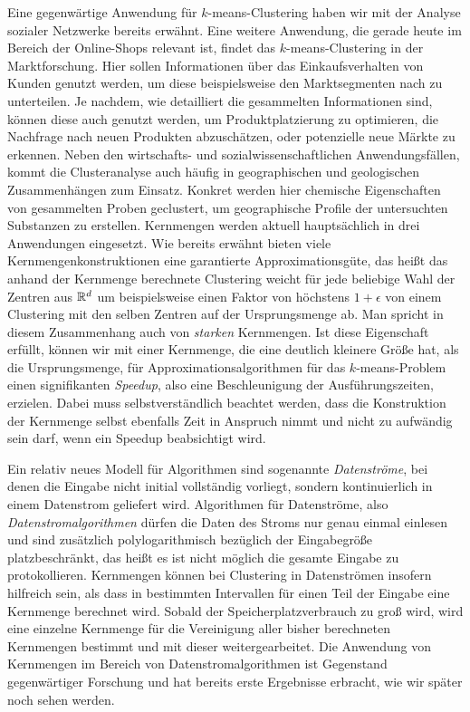 Eine gegenwärtige Anwendung für $k$-means-Clustering haben wir mit der Analyse sozialer Netzwerke bereits erwähnt. Eine weitere
Anwendung, die gerade heute im Bereich der Online-Shops relevant ist, findet das $k$-means-Clustering in der Marktforschung.
Hier sollen Informationen über das Einkaufsverhalten von Kunden genutzt werden, um diese beispielsweise den Marktsegmenten nach
zu unterteilen. Je nachdem, wie detailliert die gesammelten Informationen sind, können diese auch genutzt werden, um
Produktplatzierung zu optimieren, die Nachfrage nach neuen Produkten abzuschätzen, oder potenzielle neue Märkte zu
erkennen. Neben den wirtschafts- und sozialwissenschaftlichen Anwendungsfällen, kommt die Clusteranalyse auch häufig in
geographischen und geologischen Zusammenhängen zum Einsatz. Konkret werden hier chemische Eigenschaften von gesammelten
Proben geclustert, um geographische Profile der untersuchten Substanzen zu erstellen.
\absatz
Kernmengen werden aktuell hauptsächlich in drei Anwendungen eingesetzt. Wie bereits erwähnt bieten viele Kernmengenkonstruktionen
eine garantierte Approximationsgüte, das heißt das anhand der Kernmenge berechnete Clustering weicht für jede beliebige
Wahl der Zentren aus $\mathbb{R}^{d}$ um beispielsweise einen Faktor von höchstens $1 + \epsilon$ von einem Clustering mit den
selben Zentren auf der Ursprungsmenge ab. Man spricht in diesem Zusammenhang auch von \emph{starken} Kernmengen.
Ist diese Eigenschaft erfüllt, können wir mit einer Kernmenge, die eine deutlich kleinere Größe hat, als die Ursprungsmenge,
für Approximationsalgorithmen für das $k$-means-Problem einen signifikanten \emph{Speedup}, also eine Beschleunigung der
Ausführungszeiten, erzielen. Dabei muss selbstverständlich beachtet werden, dass die Konstruktion der Kernmenge selbst
ebenfalls Zeit in Anspruch nimmt und nicht zu aufwändig sein darf, wenn ein Speedup beabsichtigt wird. 

Ein relativ neues Modell für Algorithmen sind sogenannte \emph{Datenströme}, bei denen die Eingabe nicht initial vollständig
vorliegt, sondern kontinuierlich in einem Datenstrom geliefert wird. Algorithmen für Datenströme, also
\emph{Datenstromalgorithmen} dürfen die Daten des Stroms nur genau einmal einlesen und sind zusätzlich polylogarithmisch
bezüglich der Eingabegröße platzbeschränkt, das heißt es ist nicht möglich die gesamte Eingabe zu protokollieren. Kernmengen
können bei Clustering in Datenströmen insofern hilfreich sein, als dass in bestimmten Intervallen für einen Teil der Eingabe
eine Kernmenge berechnet wird. Sobald der Speicherplatzverbrauch zu groß wird, wird eine einzelne Kernmenge für die Vereinigung
aller bisher berechneten Kernmengen bestimmt und mit dieser weitergearbeitet. Die Anwendung von Kernmengen im Bereich von
Datenstromalgorithmen ist Gegenstand gegenwärtiger Forschung und hat bereits erste Ergebnisse erbracht, wie wir später noch
sehen werden.

